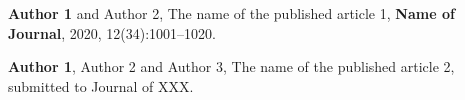 

\begin{publications}

\begin{biblist}
\item \textbf{Author 1} and Author 2, The name of the published article 1, \textbf{Name of Journal}, 2020, 12(34):1001--1020.

\item {\textbf{Author 1},  Author 2 and Author 3}, The name of the published article 2, submitted to Journal of XXX.
\end{biblist}

%

\end{publications}

